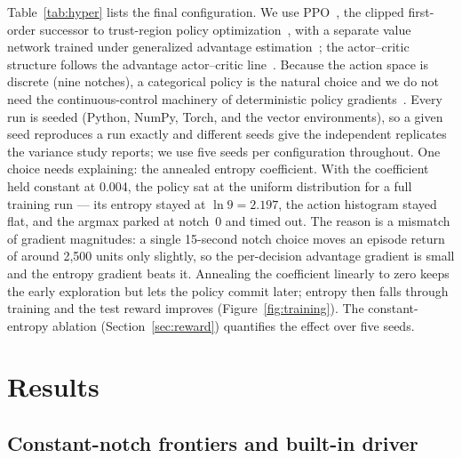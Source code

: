\documentclass[11pt,a4paper]{article}
\begin{document}
Table~\ref{tab:hyper} lists the final configuration. We use
PPO~\cite{schulman2017ppo}, the clipped first-order successor to
trust-region policy optimization~\cite{schulman2015trpo}, with a separate
value network trained under generalized advantage
estimation~\cite{schulman2016gae}; the actor--critic structure follows the
advantage actor--critic line~\cite{mnih2016a3c}. Because the action space is
discrete (nine notches), a categorical policy is the natural choice and we
do not need the continuous-control machinery of deterministic policy
gradients~\cite{lillicrap2016ddpg}. Every run is seeded (Python, NumPy,
Torch, and the vector environments), so a given seed reproduces a run
exactly and different seeds give the independent replicates the variance
study reports; we use five seeds per configuration throughout. One choice
needs explaining: the annealed entropy coefficient. With the
coefficient held constant at 0.004, the policy sat at the uniform
distribution for a full training run --- its entropy stayed at
$\ln 9 = 2.197$, the action histogram stayed flat, and the argmax parked at
notch~0 and timed out. The reason is a mismatch of gradient magnitudes: a
single 15-second notch choice moves an episode return of around 2{,}500
units only slightly, so the per-decision advantage gradient is small and the
entropy gradient beats it. Annealing the coefficient linearly to zero keeps
the early exploration but lets the policy commit later; entropy then falls
through training and the test reward improves
(Figure~\ref{fig:training}). The constant-entropy ablation
(Section~\ref{sec:reward}) quantifies the effect over five seeds.

\section{Results}
\label{sec:results}

\subsection{Constant-notch frontiers and built-in driver}
\end{document}
